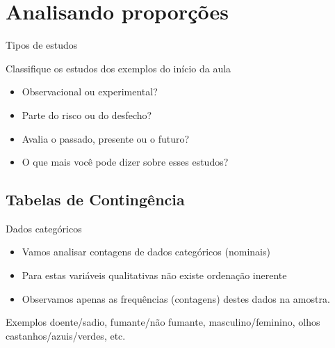 \documentclass{beamer}
\begin{document}
\section{Analisando proporções}

\begin{frame}{\scriptsize Tipos de estudos}
  \begin{block}{}
    \footnotesize
    Classifique os estudos dos exemplos do início da aula

    \begin{itemize}
    \item Observacional ou experimental?
    \item Parte do risco ou do desfecho?
    \item Avalia o passado, presente ou o futuro?
    \item O que mais você pode dizer sobre esses estudos?
    \end{itemize}
  \end{block}
\end{frame}



\subsection{Tabelas de Contingência}

\begin{frame}{\scriptsize Dados categóricos}
  \begin{itemize}
  \item Vamos analisar contagens de dados categóricos (nominais)
  \item Para estas variáveis qualitativas não existe ordenação inerente
  \item Observamos apenas as frequências (contagens) destes dados na amostra.
  \end{itemize}
  \begin{exampleblock}{Exemplos}
    doente/sadio, fumante/não fumante, masculino/feminino, olhos
    castanhos/azuis/verdes, etc.
  \end{exampleblock}
\end{frame}
\end{document}
